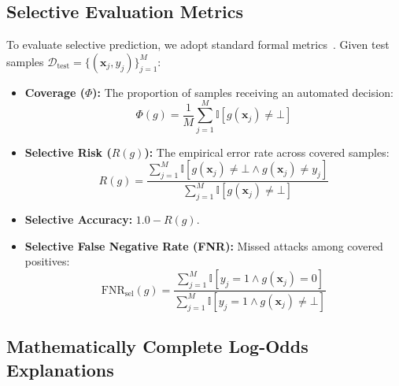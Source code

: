 \documentclass[conference]{IEEEtran}
\begin{document}
\subsection{Selective Evaluation Metrics}\label{selective-metrics}

To evaluate selective prediction, we adopt standard formal metrics~\cite{calzarossa2025,bezerra2025}. Given test samples $\mathcal{D}_{\text{test}} = \{(\mathbf{x}_j, y_j)\}_{j=1}^M$:
\begin{itemize}[leftmargin=2.5em]
    \item \textbf{Coverage ($\Phi$):} The proportion of samples receiving an automated decision:
    \begin{equation}
    \Phi(g) = \frac{1}{M} \sum_{j=1}^M \mathbb{I}[g(\mathbf{x}_j) \ne \bot]
    \end{equation}
    \item \textbf{Selective Risk ($R(g)$):} The empirical error rate across covered samples:
    \begin{equation}
    R(g) = \frac{\sum_{j=1}^M \mathbb{I}[g(\mathbf{x}_j) \ne \bot \land g(\mathbf{x}_j) \ne y_j]}{\sum_{j=1}^M \mathbb{I}[g(\mathbf{x}_j) \ne \bot]}
    \end{equation}
    \item \textbf{Selective Accuracy:} $1.0 - R(g)$.
    \item \textbf{Selective False Negative Rate (FNR):} Missed attacks among covered positives:
    \begin{equation}
    \text{FNR}_{\text{sel}}(g) = \frac{\sum_{j=1}^M \mathbb{I}[y_j = 1 \land g(\mathbf{x}_j) = 0]}{\sum_{j=1}^M \mathbb{I}[y_j = 1 \land g(\mathbf{x}_j) \ne \bot]}
    \end{equation}
\end{itemize}

\subsection{Mathematically Complete Log-Odds Explanations}\label{explainability-module}
\end{document}
